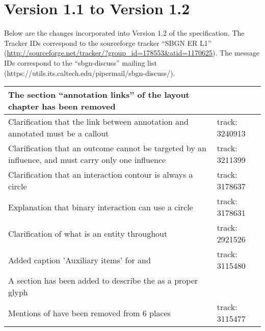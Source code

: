 \section{Version 1.1 to Version 1.2}

Below are the changes incorporated into Version 1.2 of the \SBGNERLone specification. The Tracker IDs correspond to the sourceforge tracker ``SBGN ER L1'' (\url{http://sourceforge.net/tracker/?group_id=178553&atid=1170625}). The message IDs correspond to the ``sbgn-discuss'' mailing list (https://utils.its.caltech.edu/pipermail/sbgn-discuss/).

\begin{center}
\label{tab:revision history 1.2}
\tablelasttail{\hline}
\begin{supertabular}{|p{0.75\textwidth}|p{0.25\textwidth}|}\hline
The section ``annotation links'' of the layout chapter has been removed &  \\\hline
Clarification that the link between annotation and annotated must be a callout & track: 3240913 \\\hline
Clarification that an outcome cannot be targeted by an influence, and must carry only one influence & track: 3211399 \\\hline
Clarification that an interaction contour is always a circle & track: 3178637 \\\hline
Explanation that binary interaction can use a circle & track: 3178631 \\\hline
Clarification of what is an entity throughout & track: 2921526\\\hline
Added caption 'Auxiliary items' for  and  & track: 3115480\\\hline
A section has been added to describe the  as a proper glyph & \\\hline
Mentions of  have been removed from 6 places & track: 3115477\\\hline
\end{supertabular}
\end{center}


